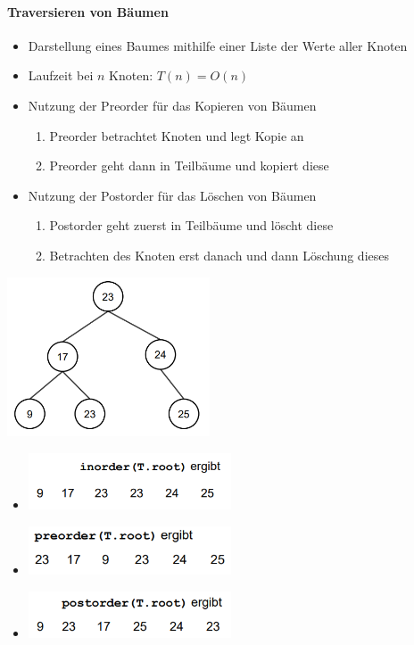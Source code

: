 \documentclass[
    ngerman,
    color=3b,
    load_common, %
    summary,
    boxarc,
]{tuda_summary}
\begin{document}
\paragraph{Traversieren von Bäumen}
\begin{itemize}
    \item Darstellung eines Baumes mithilfe einer Liste der Werte aller Knoten
    \item Laufzeit bei $n$ Knoten: $T(n) = O(n)$
    \item Nutzung der Preorder für das Kopieren von Bäumen
          \begin{enumerate}
              \item Preorder betrachtet Knoten und legt Kopie an
              \item Preorder geht dann in Teilbäume und kopiert diese
          \end{enumerate}
    \item Nutzung der Postorder für das Löschen von Bäumen
          \begin{enumerate}
              \item Postorder geht zuerst in Teilbäume und löscht diese
              \item Betrachten des Knoten erst danach und dann Löschung dieses
          \end{enumerate}
\end{itemize}
\begin{minipage}[c]{0.4\textwidth}\mbox{}
    \includegraphics[width=6cm]{pictures/inorder1}
\end{minipage}
\begin{minipage}[c]{0.5\textwidth}\mbox{}
    \begin{itemize}
        \item[] \includegraphics[width=6cm]{pictures/inorder2}
        \item[] \includegraphics[width=6cm]{pictures/preorder1}
        \item[] \includegraphics[width=6cm]{pictures/postorder1}
    \end{itemize}
\end{minipage}
\end{document}
